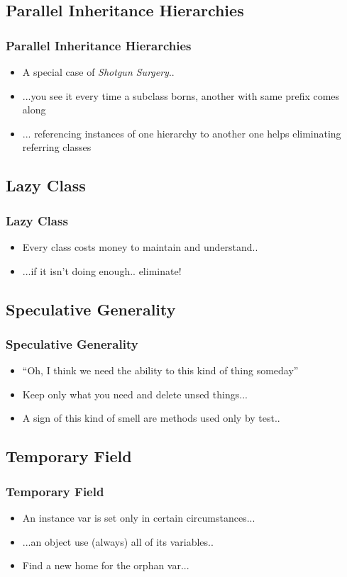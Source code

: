 \documentclass{beamer}
\begin{document}
\subsection{Parallel Inheritance Hierarchies}
\begin{frame}
  \frametitle{Parallel Inheritance Hierarchies}
  \begin{itemize}
	\item<+-> A special case of \textit{Shotgun Surgery}..
	\item<+-> ...you see it every time a subclass borns, another with same prefix comes along 
	\item<+-> ... referencing instances of one hierarchy to another one helps eliminating referring classes
  \end{itemize}
\end{frame}

\subsection{Lazy Class}
\begin{frame}
  \frametitle{Lazy Class}
  \begin{itemize}
	\item<+-> Every class costs money to maintain and understand..
	\item<+-> ...if it isn't doing enough.. eliminate! 
  \end{itemize}
\end{frame}

\subsection{Speculative Generality}
\begin{frame}
  \frametitle{Speculative Generality}
  \begin{itemize}
	\item<+-> ``Oh, I think we need the ability to this kind of thing someday''
	\item<+-> Keep only what you need and delete unsed things...
	\item<+-> A sign of this  kind of smell are methods used only by test..
  \end{itemize}
\end{frame}

\subsection{Temporary Field}
\begin{frame}
  \frametitle{Temporary Field}
  \begin{itemize}
	\item<+-> An instance var is set only in certain circumstances...
	\item<+-> ...an object use (always) all of its variables.. 
	\item<+-> Find a new home for the orphan var...
  \end{itemize}
\end{frame}
\end{document}
